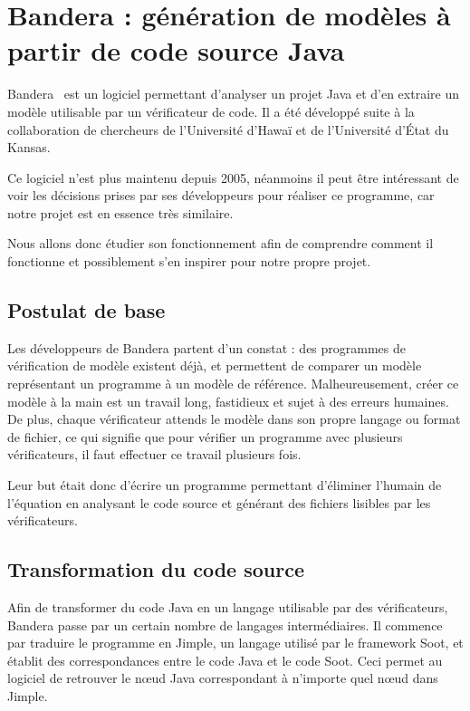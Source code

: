 \chapter{Bandera : génération de modèles à partir de code source Java}

Bandera~\cite{bandera1} est un logiciel permettant d'analyser un projet Java et d'en
extraire un modèle utilisable par un vérificateur de code. Il a été
développé suite à la collaboration de chercheurs de l'Université
d'Hawaï et de l'Université d'État du Kansas.

Ce logiciel n'est plus maintenu depuis 2005, néanmoins il peut être
intéressant de voir les décisions prises par ses développeurs pour
réaliser ce programme, car notre projet est en essence très similaire.

Nous allons donc étudier son fonctionnement afin de comprendre comment
il fonctionne et possiblement s'en inspirer pour notre propre projet.

\section{Postulat de base}

Les développeurs de Bandera partent d'un constat : des programmes de
vérification de modèle existent déjà, et permettent de comparer un
modèle représentant un programme à un modèle de
référence. Malheureusement, créer ce modèle à la main est un travail
long, fastidieux et sujet à des erreurs humaines. De plus, chaque
vérificateur attends le modèle dans son propre langage ou format de
fichier, ce qui signifie que pour vérifier un programme avec plusieurs
vérificateurs, il faut effectuer ce travail plusieurs fois.

Leur but était donc d'écrire un programme permettant d'éliminer
l'humain de l'équation en analysant le code source et générant des
fichiers lisibles par les vérificateurs. 

\section{Transformation du code source}

Afin de transformer du code Java en un langage utilisable par des
vérificateurs, Bandera passe par un certain nombre de langages
intermédiaires. Il commence par traduire le programme en Jimple, un
langage utilisé par le framework Soot, et établit des correspondances
entre le code Java et le code Soot. Ceci permet au logiciel de
retrouver le n\oe{}ud Java correspondant à n'importe quel n\oe{}ud
dans Jimple.

